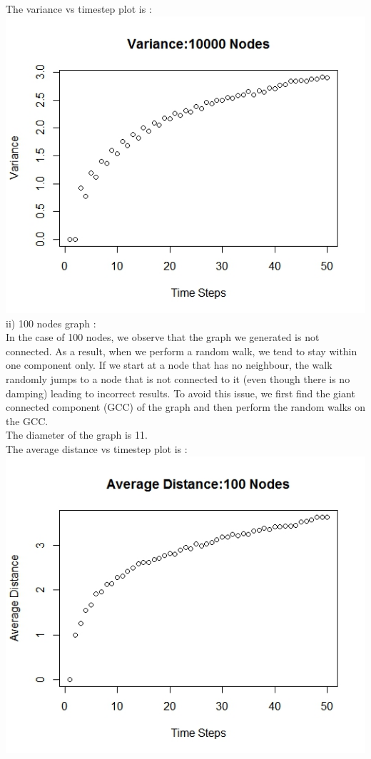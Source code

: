 \documentclass{article}
\begin{document}
The variance vs timestep plot is :\\
\includegraphics[scale=0.4]{p2j} \\
ii) 100 nodes graph :\\
In the case of 100 nodes, we observe that the graph we generated is not connected.
As a result, when we perform a random walk, we tend to stay within one component only. If we
start at a node that has no neighbour, the walk randomly jumps to a node that is not connected to it
(even though there is no damping) leading to incorrect results. To avoid this issue, we first find the 
giant connected component (GCC) of the graph and then perform the random walks on the GCC.\\
The diameter of the graph is 11.\\
The average distance vs timestep plot is :\\
\includegraphics[scale=0.4]{p2d} \\
\end{document}
